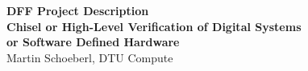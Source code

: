 \documentclass[fleqn,12pt]{article}
\begin{document}
\setlength{\baselineskip}{1.44\baselineskip}


\begin{center}
  {\LARGE\bf DFF Project Description }\\[1ex]
  {\LARGE\bf  Chisel or High-Level Verification of Digital Systems\\
  or Software Defined Hardware}\\[1ex]
  {\large Martin Schoeberl, DTU Compute}\\[1ex]
 \end{center}




%
%
\end{document}
